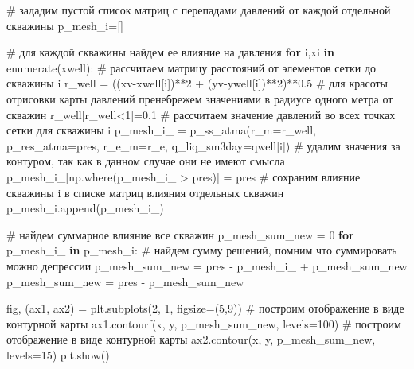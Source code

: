 \documentclass[
  russian,
  letterpaper,
  DIV=11,
  numbers=noendperiod,
  oneside]{scrartcl}
\newenvironment{Shaded}{\begin{snugshade}}{\end{snugshade}}
\newcommand{\BuiltInTok}[1]{\textcolor[rgb]{0.00,0.23,0.31}{#1}}
\newcommand{\CommentTok}[1]{\textcolor[rgb]{0.37,0.37,0.37}{#1}}
\newcommand{\ControlFlowTok}[1]{\textcolor[rgb]{0.00,0.23,0.31}{\textbf{#1}}}
\newcommand{\DecValTok}[1]{\textcolor[rgb]{0.68,0.00,0.00}{#1}}
\newcommand{\FloatTok}[1]{\textcolor[rgb]{0.68,0.00,0.00}{#1}}
\newcommand{\KeywordTok}[1]{\textcolor[rgb]{0.00,0.23,0.31}{\textbf{#1}}}
\newcommand{\NormalTok}[1]{\textcolor[rgb]{0.00,0.23,0.31}{#1}}
\newcommand{\OperatorTok}[1]{\textcolor[rgb]{0.37,0.37,0.37}{#1}}
\begin{document}
{\begin{footnotesize}
\begin{Shaded}
\begin{Highlighting}[]
\CommentTok{\# зададим пустой список матриц с перепадами давлений от каждой отдельной скважины}
\NormalTok{p\_mesh\_i}\OperatorTok{=}\NormalTok{[]}

\CommentTok{\# для каждой скважины найдем ее влияние на давления}
\ControlFlowTok{for}\NormalTok{ i,xi }\KeywordTok{in} \BuiltInTok{enumerate}\NormalTok{(xwell):}
    \CommentTok{\# рассчитаем матрицу расстояний от элементов сетки до скважины i}
\NormalTok{    r\_well }\OperatorTok{=}\NormalTok{ ((xv}\OperatorTok{{-}}\NormalTok{xwell[i])}\OperatorTok{**}\DecValTok{2} \OperatorTok{+}\NormalTok{ (yv}\OperatorTok{{-}}\NormalTok{ywell[i])}\OperatorTok{**}\DecValTok{2}\NormalTok{)}\OperatorTok{**}\FloatTok{0.5}
    \CommentTok{\# для красоты отрисовки карты давлений пренебрежем значениями в радиусе одного метра от скважин}
\NormalTok{    r\_well[r\_well}\OperatorTok{\textless{}}\DecValTok{1}\NormalTok{]}\OperatorTok{=}\FloatTok{0.1}
    \CommentTok{\# рассчитаем значение давлений во всех точках сетки для скважины i}
\NormalTok{    p\_mesh\_i\_ }\OperatorTok{=}\NormalTok{ p\_ss\_atma(r\_m}\OperatorTok{=}\NormalTok{r\_well, p\_res\_atma}\OperatorTok{=}\NormalTok{pres, r\_e\_m}\OperatorTok{=}\NormalTok{r\_e, q\_liq\_sm3day}\OperatorTok{=}\NormalTok{qwell[i])}
    \CommentTok{\# удалим значения за контуром, так как в данном случае они не имеют смысла}
\NormalTok{    p\_mesh\_i\_[np.where(p\_mesh\_i\_ }\OperatorTok{\textgreater{}}\NormalTok{ pres)] }\OperatorTok{=}\NormalTok{ pres}
    \CommentTok{\# сохраним влияние скважины i в списке матриц влияния отдельных скважин}
\NormalTok{    p\_mesh\_i.append(p\_mesh\_i\_)}
    
\CommentTok{\# найдем суммарное влияние все скважин}
\NormalTok{p\_mesh\_sum\_new }\OperatorTok{=} \DecValTok{0}
\ControlFlowTok{for}\NormalTok{ p\_mesh\_i\_ }\KeywordTok{in}\NormalTok{ p\_mesh\_i:}
    \CommentTok{\# найдем сумму решений, помним что суммировать можно депрессии}
\NormalTok{    p\_mesh\_sum\_new }\OperatorTok{=}\NormalTok{ pres }\OperatorTok{{-}}\NormalTok{ p\_mesh\_i\_ }\OperatorTok{+}\NormalTok{ p\_mesh\_sum\_new}
\NormalTok{p\_mesh\_sum\_new }\OperatorTok{=}\NormalTok{ pres }\OperatorTok{{-}}\NormalTok{  p\_mesh\_sum\_new}

\NormalTok{fig, (ax1, ax2) }\OperatorTok{=}\NormalTok{ plt.subplots(}\DecValTok{2}\NormalTok{, }\DecValTok{1}\NormalTok{, figsize}\OperatorTok{=}\NormalTok{(}\DecValTok{5}\NormalTok{,}\DecValTok{9}\NormalTok{))}
\CommentTok{\# построим отображение в виде контурной карты}
\NormalTok{ax1.contourf(x, y, p\_mesh\_sum\_new, levels}\OperatorTok{=}\DecValTok{100}\NormalTok{)}
\CommentTok{\# построим отображение в виде контурной карты}
\NormalTok{ax2.contour(x, y, p\_mesh\_sum\_new, levels}\OperatorTok{=}\DecValTok{15}\NormalTok{)}
\NormalTok{plt.show()}
\end{Highlighting}
\end{Shaded}


\end{footnotesize}}
\end{document}
